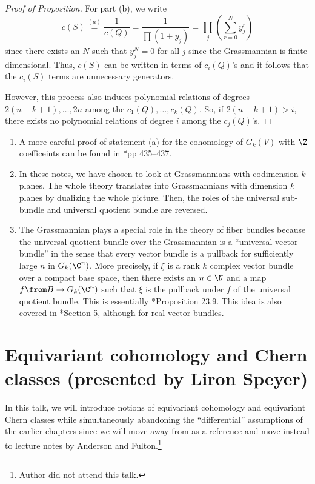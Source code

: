 \documentclass[11pt,leqno,oneside]{amsbook}
\numberwithin{thm}{section}
\begin{document}
\begin{proof}[Proof of Proposition]
  For part (b), we write \[
    c(S) \overset{(a)}{=} \frac{1}{c(Q)} = \frac{1}{\prod (1+y_j)} =
    \prod_j \left( \sum_{r=0}^N y_j^r \right)
  \]
  since there exists an \(N\) such that \(y_j^N = 0\) for all
  \(j\) since the Grassmannian is finite dimensional. Thus, \(c(S)\)
  can be written in terms of 
  \(c_i(Q)\)'s and it follows that the \(c_i(S)\) terms are
  unnecessary generators.

  However, this process also induces polynomial relations of degrees
  \(2(n-k+1), \ldots, 2n\) among the \(c_1(Q), \ldots, c_k(Q)\). So,
  if \(2(n-k+1) > i\), there exists no polynomial relations of degree
  \(i\) among the \(c_j(Q)\)'s. 
\end{proof}
\begin{rmk}
  \begin{enumerate}
  \item A more careful proof of statement (a) for the cohomology of
    \(G_k(V)\) with \(\Z\) coefficeints can be found in
    \cite{hatcher}*{pp 435--437}.
  \item In these notes, we have chosen to look at Grassmannians with
    codimension \(k\) planes. The whole theory translates into
    Grassmannians with dimension \(k\) planes by dualizing the whole
    picture. Then, the roles of the universal sub-bundle and universal
    quotient bundle are reversed. 
  \item The Grassmannian plays a special role in the theory of fiber
    bundles because the universal quotient bundle over the Grassmannian
    is a ``universal vector bundle'' in the sense that every vector
    bundle is a pullback for sufficiently large \(n\) in
    \(G_k(\C^n)\). More precisely, if \(\xi\) is a rank \(k\) complex
    vector bundle over a compact base space, then there exists an
    \(n \in \N\) and a map \(f \from B \to G_k(\C^n)\) such that
    \(\xi\) is the pullback under \(f\) of the universal quotient
    bundle. This is essentially \cite{bott-tu}*{Proposition
      23.9}. This idea is also covered in
    \cite{milnor-stasheff}*{Section 5}, although for real vector
    bundles. 
  \end{enumerate}
\end{rmk}
\section{Equivariant cohomology and Chern classes (presented by Liron
  Speyer) }
In this talk, we will introduce notions of equivariant cohomology and
equivariant Chern classes while simultaneously abandoning the
``differential'' assumptions of the earlier chapters since we will
move away from \cite{bott-tu} as a reference and move instead to
lecture notes by Anderson and Fulton.\footnote{Author did not attend
  this talk.}
\end{document}
